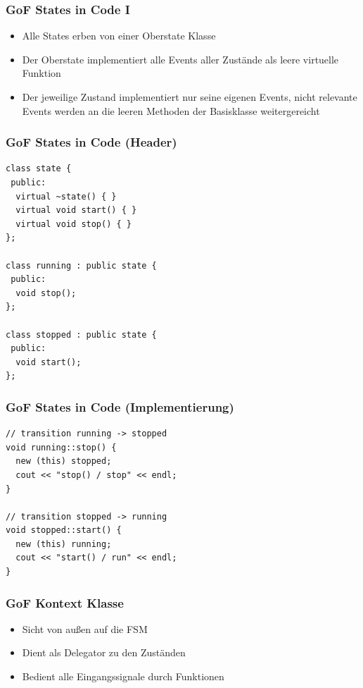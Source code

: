 \documentclass{beamer}
\begin{document}
\begin{frame}
 \frametitle{GoF States in Code I}
 \begin{itemize}
  \item Alle States erben von einer Oberstate Klasse
  \item Der Oberstate implementiert alle Events aller Zust\"ande als leere virtuelle Funktion
  \item Der jeweilige Zustand implementiert nur seine eigenen Events, nicht relevante
  Events werden an die leeren Methoden der Basisklasse weitergereicht
 \end{itemize}
\end{frame}

\begin{frame}[fragile]
 \frametitle{GoF States in Code (Header)}
 \begin{lstlisting}
class state {
 public:
  virtual ~state() { }
  virtual void start() { }
  virtual void stop() { }
};

class running : public state {
 public:
  void stop();
};

class stopped : public state {
 public:
  void start();
};
 \end{lstlisting}
\end{frame}

\begin{frame}[fragile]
 \frametitle{GoF States in Code (Implementierung)}
 \begin{lstlisting}
// transition running -> stopped
void running::stop() {
  new (this) stopped;
  cout << "stop() / stop" << endl;
}

// transition stopped -> running
void stopped::start() {
  new (this) running;
  cout << "start() / run" << endl;
}
 \end{lstlisting}
\end{frame}

\begin{frame}
 \frametitle{GoF Kontext Klasse}
 \begin{itemize}
  \item Sicht von au{\ss}en auf die FSM
  \item Dient als Delegator zu den Zust\"anden
  \item Bedient alle Eingangssignale durch Funktionen
 \end{itemize}
\end{frame}
\end{document}

